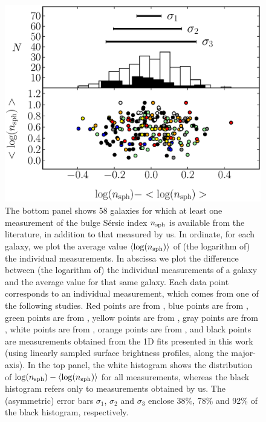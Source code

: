 \documentclass[preprint2]{emulateapj}
\begin{document}
\begin{figure}%
\begin{center}
\includegraphics[width=1.1\columnwidth]{images/comparison_all_n.eps} 
\caption{The bottom panel shows 58 galaxies for which at least one measurement of the bulge S\'ersic index $n_{\rm sph}$ is available 
from the literature, in addition to that measured by us.
In ordinate, for each galaxy, we plot the average value $\langle \log(n_{\rm sph}) \rangle$ of (the logarithm of) the individual measurements. 
In abscissa we plot the difference between (the logarithm of) the individual measurements of a galaxy 
and the average value for that same galaxy.
Each data point corresponds to an individual measurement, 
which comes from one of the following studies. 
Red points are from \cite{grahamdriver2007}, 
blue points are from \cite{laurikainen2010}, green points are from \cite{sani2011}, 
yellow points are from \cite{vika2012}, gray points are from \cite{beifiori2012},
white points are from \cite{rusli2013}, orange points are from \cite{lasker2014data},
and black points are measurements obtained from the 1D fits presented in this work 
(using linearly sampled surface brightness profiles, along the major-axis).
In the top panel, the white histogram shows the distribution of $\log(n_{\rm sph}) - \langle \log(n_{\rm sph}) \rangle$ 
for all measurements, 
whereas the black histogram refers only to measurements obtained by us.
The (asymmetric) error bars $\sigma_1$, $\sigma_2$ and $\sigma_3$ enclose 38\%, 78\% and 92\% 
of the black histogram, respectively.}
\label{fig:compn}
\end{center}
\end{figure}
\end{document}

